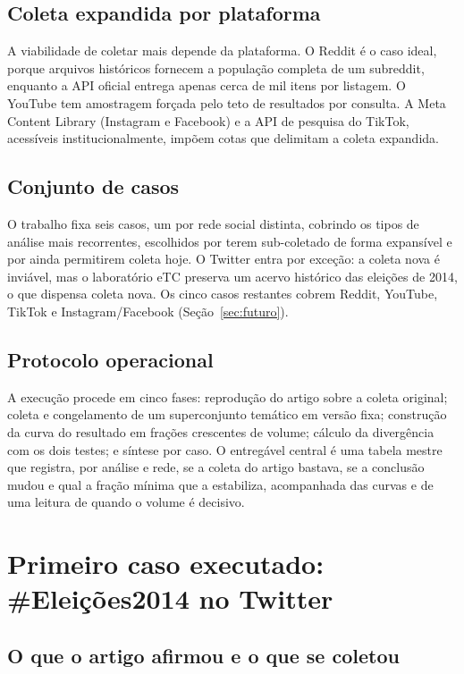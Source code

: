 \documentclass[12pt,a4paper]{article}
\begin{document}
\subsection{Coleta expandida por plataforma}

A viabilidade de coletar mais depende da plataforma. O Reddit é o caso ideal,
porque arquivos históricos fornecem a população completa de um subreddit, enquanto
a API oficial entrega apenas cerca de mil itens por listagem. O YouTube tem
amostragem forçada pelo teto de resultados por consulta. A Meta Content Library
(Instagram e Facebook) e a API de pesquisa do TikTok, acessíveis
institucionalmente, impõem cotas que delimitam a coleta expandida.

\subsection{Conjunto de casos}

O trabalho fixa seis casos, um por rede social distinta, cobrindo os tipos de
análise mais recorrentes, escolhidos por terem sub-coletado de forma expansível e
por ainda permitirem coleta hoje. O Twitter entra por exceção: a coleta nova é
inviável, mas o laboratório eTC preserva um acervo histórico das eleições de 2014,
o que dispensa coleta nova. Os cinco casos restantes cobrem Reddit, YouTube,
TikTok e Instagram/Facebook (Seção~\ref{sec:futuro}).

\subsection{Protocolo operacional}

A execução procede em cinco fases: reprodução do artigo sobre a coleta original;
coleta e congelamento de um superconjunto temático em versão fixa; construção da
curva do resultado em frações crescentes de volume; cálculo da divergência com os
dois testes; e síntese por caso. O entregável central é uma tabela mestre que
registra, por análise e rede, se a coleta do artigo bastava, se a conclusão mudou
e qual a fração mínima que a estabiliza, acompanhada das curvas e de uma leitura
de quando o volume é decisivo.

\section{Primeiro caso executado: \#Eleições2014 no Twitter}

\subsection{O que o artigo afirmou e o que se coletou}
\end{document}
